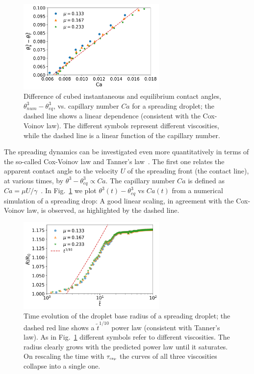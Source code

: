 \begin{figure}
    \centering 
    \includegraphics[width=0.65\textwidth]{graphics/Fig_5_Indirect_Cox_Voinov_all_data_visually_appealing_slip_2_m_nosci.png}
    \caption{Difference of cubed instantaneous and equilibrium contact angles, $\theta_{num}^3-\theta_{eq}^3$, vs. capillary number $Ca$ for a spreading droplet; the dashed line shows a linear dependence (consistent with the Cox-Voinov law). The different symbols represent different viscosities, while the dashed line is a linear function of the capillary number.}
    \label{fig:Cox-Voinov}
\end{figure}
The spreading dynamics can be investigated even more quantitatively in terms of the so-called Cox-Voinov law and Tanner's law~\cite{tannerSpreadingSiliconeOil1979}. 
The first one relates the apparent contact angle to the velocity $U$ of the spreading front (the contact line), at various times, by $\theta^3 - \theta_{eq}^3 \propto Ca$. 
The capillary number $Ca$ is defined as $Ca=\mu U/\gamma$~\cite{snoeijerMovingContactLines2013}.
In Fig.~\ref{fig:Cox-Voinov} we plot $\theta^3(t) - \theta_{eq}^3$ vs $Ca(t)$ from a numerical simulation of a spreading drop: A good linear scaling, in agreement with the Cox-Voinov law, is observed, as highlighted by the dashed line. 
\begin{figure}
    \centering
    \includegraphics[width=0.65\textwidth]{graphics/Fig_6_Tanners_law_slip_2_paper_rescaled_t.png}
    \caption{Time evolution of the droplet base radius of a spreading droplet; the dashed red line shows a $\tilde{t}^{1/10}$ power law (consistent with Tanner's law). 
    As in Fig.~\ref{fig:Cox-Voinov} different symbols refer to different viscosities. The radius clearly grows with the predicted power law until it saturates. 
    On rescaling the time with $\tau_{\mbox{\tiny{cap}}}$ the curves of all three viscosities collapse into a single one.}
    \label{fig:Tanners_law}
\end{figure}
